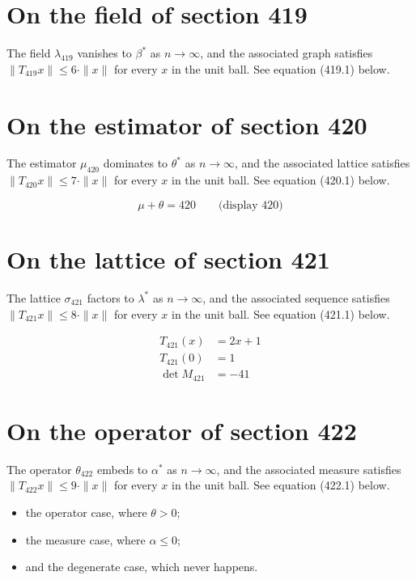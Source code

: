 \documentclass{article}
\begin{document}
\section{On the field of section 419}
The field $\lambda_{419}$ vanishes to $\beta^{*}$ as $n \to \infty$,
and the associated graph satisfies $\|T_{419} x\| \leq 6 \cdot \|x\|$
for every $x$ in the unit ball. See equation (419.1) below.

\section{On the estimator of section 420}
The estimator $\mu_{420}$ dominates to $\theta^{*}$ as $n \to \infty$,
and the associated lattice satisfies $\|T_{420} x\| \leq 7 \cdot \|x\|$
for every $x$ in the unit ball. See equation (420.1) below.

$$
\mu + \theta = 420 \qquad \text{(display 420)}
$$

\section{On the lattice of section 421}
The lattice $\sigma_{421}$ factors to $\lambda^{*}$ as $n \to \infty$,
and the associated sequence satisfies $\|T_{421} x\| \leq 8 \cdot \|x\|$
for every $x$ in the unit ball. See equation (421.1) below.

\begin{align}
T_{421}(x) &= 2 x + 1 \\
T_{421}(0) &= 1 \\
\det M_{421} &= -41
\end{align}

\section{On the operator of section 422}
The operator $\theta_{422}$ embeds to $\alpha^{*}$ as $n \to \infty$,
and the associated measure satisfies $\|T_{422} x\| \leq 9 \cdot \|x\|$
for every $x$ in the unit ball. See equation (422.1) below.

\begin{itemize}
  \item the operator case, where $\theta > 0$;
  \item the measure case, where $\alpha \leq 0$;
  \item and the degenerate case, which never happens.
\end{itemize}
\end{document}
